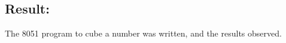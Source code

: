 \documentclass[12pt,a4paper]{article}
\begin{document}
\begin{flushleft}
\subsection*{\textbf{Result:}}
The 8051 program to cube a number was written, and the results observed.
\end{flushleft}
\end{document}
